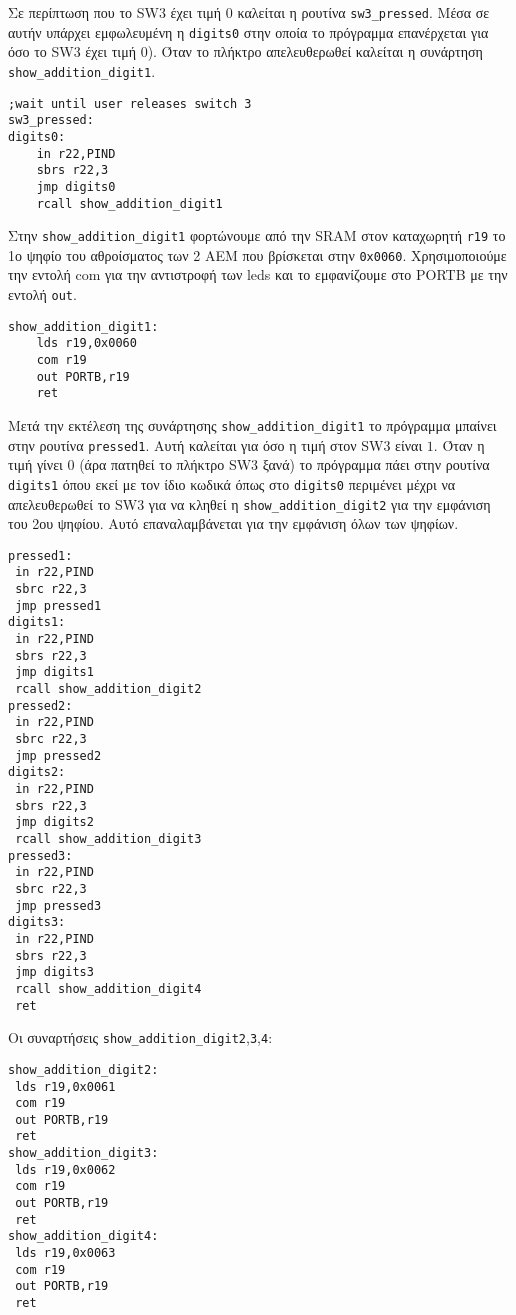 Σε περίπτωση που το SW3 έχει τιμή $0$ καλείται η ρουτίνα
\lstinline!sw3_pressed!.
Μέσα σε αυτήν υπάρχει εμφωλευμένη η \lstinline!digits0! στην οποία το
πρόγραμμα επανέρχεται για όσο το SW3 έχει τιμή $0$).
Όταν το πλήκτρο απελευθερωθεί καλείται η συνάρτηση \lstinline!show_addition_digit1!.
\begin{lstlisting}
;wait until user releases switch 3
sw3_pressed:
digits0:
	in r22,PIND
	sbrs r22,3
	jmp digits0
	rcall show_addition_digit1
\end{lstlisting}
Στην \lstinline!show_addition_digit1! φορτώνουμε από την SRAM στον καταχωρητή \lstinline!r19!
το 1ο ψηφίο του αθροίσματος των 2 ΑΕΜ που βρίσκεται στην \lstinline!0x0060!.
Χρησιμοποιούμε την εντολή com για την αντιστροφή των leds και το εμφανίζουμε στο PORTB με την εντολή
\lstinline!out!.
\begin{lstlisting}
show_addition_digit1:
	lds r19,0x0060
	com r19
	out PORTB,r19
	ret
\end{lstlisting}

Μετά την εκτέλεση της συνάρτησης \lstinline!show_addition_digit1! το πρόγραμμα
μπαίνει στην ρουτίνα \lstinline!pressed1!.
Αυτή καλείται για όσο η τιμή στον SW3 είναι $1$.
Όταν η τιμή γίνει $0$ (άρα πατηθεί το πλήκτρο SW3 ξανά)
το πρόγραμμα πάει στην ρουτίνα \lstinline!digits1! όπου εκεί με τον ίδιο κωδικά όπως στο \lstinline!digits0!
περιμένει μέχρι να απελευθερωθεί το SW3 για να κληθεί η \lstinline!show_addition_digit2! για την εμφάνιση του 2ου ψηφίου.
Αυτό επαναλαμβάνεται για την εμφάνιση όλων των ψηφίων.
\begin{lstlisting}
pressed1:
 in r22,PIND
 sbrc r22,3
 jmp pressed1
digits1:
 in r22,PIND
 sbrs r22,3
 jmp digits1
 rcall show_addition_digit2
pressed2:
 in r22,PIND
 sbrc r22,3
 jmp pressed2
digits2:
 in r22,PIND
 sbrs r22,3
 jmp digits2
 rcall show_addition_digit3
pressed3:
 in r22,PIND
 sbrc r22,3
 jmp pressed3
digits3:
 in r22,PIND
 sbrs r22,3
 jmp digits3
 rcall show_addition_digit4
 ret
\end{lstlisting}

Οι συναρτήσεις \lstinline!show_addition_digit2!,\lstinline!3!,\lstinline!4!:
\begin{lstlisting}
show_addition_digit2:
 lds r19,0x0061
 com r19
 out PORTB,r19
 ret
show_addition_digit3:
 lds r19,0x0062
 com r19
 out PORTB,r19
 ret
show_addition_digit4:
 lds r19,0x0063
 com r19
 out PORTB,r19
 ret
\end{lstlisting}